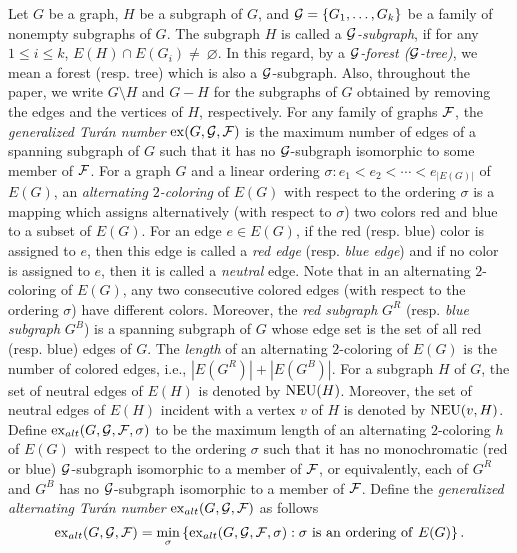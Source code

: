 \documentclass[11pt]{article}
\begin{document}
Let $G$ be a graph, $H$ be a subgraph of $G$, and ${\cal G}=\{G_1,\ldots,G_k\}$ be a family of nonempty subgraphs of $G$. The subgraph 
$H$ is called  a {\it  ${\cal G}$-subgraph}, if for any $1\leq i \leq k$, $E(H)\cap E(G_i)\not=~\varnothing$. 
In this regard, by a {\it ${\cal G}$-forest {\rm(}{\it ${\cal G}$-tree}{\rm)}}, we mean 
a forest (resp. tree) which is also a ${\cal G}$-subgraph. 
Also, throughout the paper, we write $G\setminus H$ and $G-H$ for the subgraphs of $G$ obtained by 
removing the edges and the vertices of $H$, respectively. 
For any family of graphs ${\cal F}$, the {\it generalized Tur\'an number} ${\rm ex}(G,{\cal G}, {\cal F})$ is the maximum number of edges of a spanning subgraph of 
$G$ such that it has no ${\cal G}$-subgraph isomorphic to some member of ${\cal F}$. 
For a graph $G$ and a linear ordering $\sigma: e_1<e_2<\cdots<e_{|E(G)|}$ of  $E(G)$, 
an {\it alternating  $2$-coloring} of $E(G)$ with respect to the 
ordering $\sigma$ is a mapping which assigns alternatively (with respect to $\sigma$) two colors red and blue to a subset of $E(G)$.  
For an edge $e\in E(G)$, if the red (resp. blue) color is assigned to $e$, then this edge is called a {\it red edge} (resp. {\it blue edge}) and if no color is assigned to $e$, then it is called a {\it neutral} edge.
Note that 
in an alternating $2$-coloring of $E(G)$,
any two consecutive colored edges (with respect to the ordering $\sigma$) have different colors.
Moreover, the  {\it red  subgraph} $G^R$ (resp.  {\it blue  subgraph} $G^B$) is a spanning subgraph of $G$ whose edge set is the set of all red (resp. blue) edges of $G$. 
The {\it length} of an alternating $2$-coloring of $E(G)$ is the number of colored edges, i.e., $|E(G^R)|+ |E(G^B)|$. 
For a subgraph $H$ of $G$, 
the set of neutral edges of $E(H)$ is denoted by ${\rm NEU}(H)$. Moreover, 
the set of neutral edges of $E(H)$ incident with a vertex $v$ of $H$ is denoted by ${\rm NEU}(v,H)$. 
Define ${\rm ex}_{alt}(G,{\cal G}, {\cal F}, \sigma)$ to be the maximum length of an alternating $2$-coloring $h$ of $E(G)$ 
with respect to the  
ordering $\sigma$ such that it has no monochromatic (red or blue) ${\cal G}$-subgraph isomorphic to a member of ${\cal F}$, or equivalently,  each of $G^R$ and $G^B$ has no ${\cal G}$-subgraph isomorphic to a member of ${\cal F}$. 
Define the {\it generalized alternating Tur\'an number} ${\rm ex}_{alt}(G,{\cal G},{\cal F})$ as follows
$${\rm ex}_{alt}(G,{\cal G},{\cal F})=\displaystyle\min_{\sigma} \left\{{\rm ex}_{alt}(G,{\cal G},{\cal F},\sigma): \sigma\ {\rm is}\  {\rm an}\  {\rm ordering}\  {\rm of}\ E(G)\right\}.$$
\end{document}
